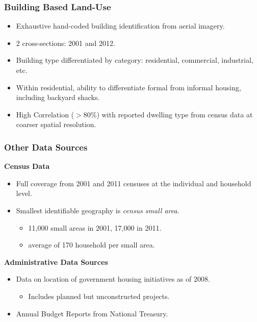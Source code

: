 \documentclass[aspectratio=149]{beamer}
\begin{document}

\begin{frame}
\frametitle{Building Based Land-Use}

\begin{itemize}

  \item Exhaustive hand-coded building identification  from aerial imagery. 
  \vspace{2mm}
  \item 2 cross-sections: 2001 and 2012. 
  \vspace{2mm}
  \item Building type differentiated by category: residential, commercial, industrial, etc.
  \vspace{2mm}
  \item Within residential, ability to differentiate formal from informal housing, including backyard shacks.
  \vspace{2mm}
  \item High Correlation ($>$80\%) with reported dwelling type from census data at coarser spatial resolution.
\end{itemize}
\end{frame}


\begin{frame}
\frametitle{Other Data Sources}



 {\bf Census Data} 



  \begin{itemize}
    \item Full coverage from 2001 and 2011 censuses at the individual and household level.

    \item Smallest identifiable geography is {\it census small area}.
    \begin{itemize}
    \item 11,000 small areas in 2001, 17,000 in 2011.
    \item average of 170 household per small area.
    \end{itemize}
  \end{itemize}

  \vspace{2mm}

  {\bf Administrative Data Sources} 



  \begin{itemize}
    \item Data on location of government housing initiatives as of 2008.
    \begin{itemize} 
      \item Includes planned but unconstructed projects.
    \end{itemize}

    \item Annual Budget Reports from National Treasury. 
    
  \end{itemize}

\end{frame}
\end{document}
